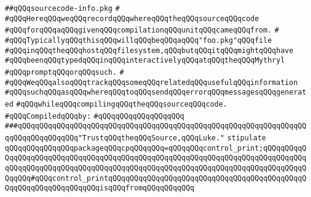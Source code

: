 \label{src/lib/compiler/front/basics/source/sourcecode-info.pkg}
\verb|##qQQqsourcecode-info.pkg|\newline
\verb|#|\newline
\verb|#qQQqHereqQQqweqQQqrecordqQQqwhereqQQqtheqQQqsourceqQQqcode|\newline
\verb|#qQQqforqQQqaqQQqgivenqQQqcompilationqQQqunitqQQqcameqQQqfrom.|\newline
\verb|#|\newline
\verb|#qQQqTypicallyqQQqthisqQQqwillqQQqbeqQQqaqQQq"foo.pkg"qQQqfile|\newline
\verb|#qQQqinqQQqtheqQQqhostqQQqfilesystem,qQQqbutqQQqitqQQqmightqQQqhave|\newline
\verb|#qQQqbeenqQQqtypedqQQqinqQQqinteractivelyqQQqatqQQqtheqQQqMythryl|\newline
\verb|#qQQqpromptqQQqorqQQqsuch.|\newline
\verb|#|\newline
\verb|#qQQqWeqQQqalsoqQQqtrackqQQqsomeqQQqrelatedqQQqusefulqQQqinformation|\newline
\verb|#qQQqsuchqQQqasqQQqwhereqQQqtoqQQqsendqQQqerrorqQQqmessagesqQQqgenerated|\newline
\verb|#qQQqwhileqQQqcompilingqQQqtheqQQqsourceqQQqcode.|\newline
\newline
\verb|#qQQqCompiledqQQqby:|\newline
\verb|#qQQqqQQqqQQqqQQqqQQq|\newline
\newline
\newline
\newline
\newline
\verb|###qQQqqQQqqQQqqQQqqQQqqQQqqQQqqQQqqQQqqQQqqQQqqQQqqQQqqQQqqQQqqQQqqQQqqQQqqQQqqQQqqQQq"TrustqQQqtheqQQqSource,qQQqLuke."|\newline
\newline
\newline
\verb|stipulate|\newline
\verb|qQQqqQQqqQQqqQQqpackageqQQqcpqQQqqQQq=qQQqqQQqcontrol_print;qQQqqQQqqQQqqQQqqQQqqQQqqQQqqQQqqQQqqQQqqQQqqQQqqQQqqQQqqQQqqQQqqQQqqQQqqQQqqQQqqQQqqQQqqQQqqQQqqQQqqQQqqQQqqQQqqQQqqQQqqQQqqQQqqQQqqQQqqQQqqQQqqQQqqQQqqQQq#qQQqcontrol_printqQQqqQQqqQQqqQQqqQQqqQQqqQQqqQQqqQQqqQQqqQQqqQQqqQQqqQQqqQQqqQQqqQQqisqQQqfromqQQqqQQqqQQq|\newline
